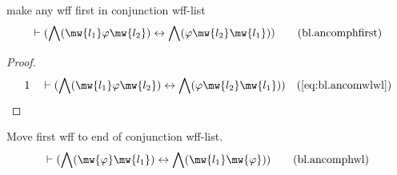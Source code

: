 \begin{lemma} make any wff first in conjunction
wff-list
\begin{align}
\vdash ( \bigwedge( \mw{l_1} \varphi \mw{l_2} ) \leftrightarrow \bigwedge(
    \varphi \mw{l_2} \mw{l_1} )
    )\label{eq:bl.ancomphfirst}\tag{bl.ancomphfirst}
\end{align}
\end{lemma}

\begin{proof}
\begin{align}
  1 &&  & \vdash ( \bigwedge( \mw{l_1} \varphi \mw{l_2} ) \leftrightarrow
       \bigwedge( \varphi \mw{l_2} \mw{l_1} )
       )&(\mbox{\ref{eq:bl.ancomwlwl}})\notag
\end{align}
\end{proof}

\begin{lemma} Move first wff to end of conjunction
wff-list.
\begin{align}
\vdash ( \bigwedge( \mw{\varphi} \mw{l_1} ) \leftrightarrow \bigwedge( \mw{l_1}
    \mw{\varphi} ) )\label{eq:bl.ancomphwl}\tag{bl.ancomphwl}
\end{align}
\end{lemma}

